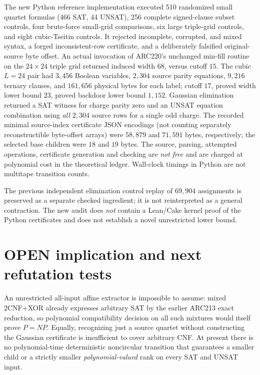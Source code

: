 \documentclass[11pt]{article}
\begin{document}
The new Python reference implementation executed 510 randomized small
quartet formulas (466 SAT, 44 UNSAT), 256 complete signed-clause subset
controls, four brute-force small-grid comparisons, six large triple-grid
controls, and eight cubic-Tseitin controls.  It rejected incomplete,
corrupted, and mixed syntax, a forged inconsistent-row certificate, and
a deliberately falsified original-source byte offset.
An actual invocation of ARC220's unchanged min-fill routine on the
$24\times24$ triple grid returned induced width $68$, versus cutoff $15$.
The cubic $L=24$ pair had $3{,}456$ Boolean variables, $2{,}304$
source parity equations, $9{,}216$ ternary clauses, and $161{,}656$
physical bytes for each label; cutoff $17$, proved width lower bound $23$,
proved backdoor lower bound $1{,}152$.  Gaussian elimination returned a
SAT witness for charge parity zero and an UNSAT equation combination
using \emph{all $2{,}304$} source rows for a single odd charge.
The recorded minimal source-index certificate JSON encodings (not
counting separately reconstructible byte-offset arrays) were $58{,}879$
and $71{,}591$ bytes, respectively; the selected base children were
$18$ and $19$ bytes.  The source, parsing, attempted operations,
certificate generation and checking are \emph{not free} and are charged
at polynomial cost in the theoretical ledger.  Wall-clock timings in
Python are not multitape transition counts.

The previous independent elimination control replay of $69{,}904$
assignments is preserved as a separate checked ingredient; it is not
reinterpreted as a general contraction.  The new audit does \emph{not}
contain a Lean/Cake kernel proof of the Python certificates and does
not establish a novel unrestricted lower bound.

\section{OPEN implication and next refutation tests}
An unrestricted all-input affine extractor is impossible to assume: mixed
2CNF+XOR already expresses arbitrary SAT by the earlier ARC213 exact
reduction, so polynomial compatibility decision on all such mixtures
would itself prove $P=NP$.  Equally, recognizing just a source quartet
without constructing the Gaussian certificate is insufficient to cover
arbitrary CNF.  At present there is no polynomial-time deterministic
noncircular transition that guarantees a smaller child or a strictly
smaller \emph{polynomial-valued} rank on every SAT and UNSAT input.
\end{document}
